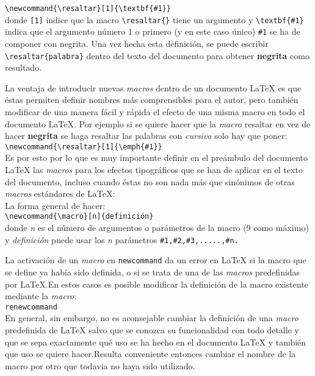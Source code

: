\verb|\newcommand{\resaltar}[1]{\textbf{#1}}| \\

donde \verb|[1]| indice que la macro \verb|\resaltar{}| tiene un argumento y \verb|\textbf{#1}| indica que el argumento número 1 o primero (y en este caso único) \verb|#1| se ha de componer con negrita. Una vez hecha esta definición, se puede escribir \verb|\resaltar{palabra}| dentro del texto del documento para  obtener \textbf{negrita} como resultado.

La ventaja de introducir nuevas \emph{macros} dentro de un documento \LaTeX{} es que éstas permiten  definir nombres más comprensibles para el autor, pero también modificar  de una manera fácil y rápida  el efecto de una misma macro en todo el documento \LaTeX{}. Por ejemplo si se quiere hacer que la \emph{macro} resaltar en vez de hacer \textbf{negrita} se haga resaltar las palabras con \emph{cursiva} solo hay que poner:\\

\verb|\newcommand{\resaltar}[1]{\emph{#1}}| \\

Es por esto por lo que es muy importante definir en el preámbulo del documento \LaTeX{} las \emph{macros} para los efectos tipográficos que se han de aplicar en el texto del documento, incluso cuando éstas no son nada más que sinónimos de otras \emph{macros} estándares de \LaTeX{}:\\
La forma general de hacer:\\

\verb|\newcommand{\macro}[n]{definición}| \\

donde \emph{n} es el número de argumentos o parámetros de la macro (9 como máximo) y \emph{definición} puede usar los \emph{n} parámetros \verb|#1,#2,#3,.....,#n.|

La activación de un \emph{macro}  en \verb|newcommand| da un error en \LaTeX{} si la macro que se define ya había sido definida, o si se trata de una de las \emph{macros} predefinidas por \LaTeX{}.En estos casos es posible modificar la definición de la macro existente mediante la \emph{macro}:\\

\verb|renewcommand| \\

\noindent En general, sin embargo, no es aconsejable cambiar la definición de una \emph{macro} predefinida de \LaTeX{} salvo que se conozca su funcionalidad con todo detalle y que se sepa exactamente qué uso se ha hecho  en el documento \LaTeX{} y también que uso se quiere hacer.Resulta conveniente entonces cambiar el nombre de la macro por otro que todavia no haya sido utilizado.

